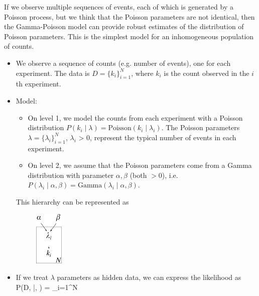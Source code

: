 If we observe multiple sequences of events, each of which is generated by a Poisson process, but we think that the Poisson parameters are not identical, then the Gamma-Poisson model can provide robust estimates of the distribution of Poisson parameters. This is the simplest model for an inhomogeneous population of counts.
\begin{itemize}
	\item We observe a sequence of counts (e.g. number of events), one for each experiment. The data is $D = \{k_i\}_{i=1}^N$, where $k_i$ is the count observed in the $i$th experiment.
	\item Model: 
	\begin{itemize}
		\item On level 1, we model the counts from each experiment with a Poisson distribution $P(k_i\;|\;\lambda) = \text{Poisson}(k_i\;|\;\lambda_i)$. The Poisson  parameters $\lambda = \{\lambda_i\}_{i=1}^N$, $\lambda_i$ > 0, represent the typical number of events in each experiment.
		\item On level 2, we assume that the Poisson parameters come from a Gamma distribution with parameter $\alpha, \beta$ (both $>0$), i.e.  $P(\lambda_i\;|\; \alpha, \beta) = \text{Gamma}(\lambda_i\;|\;\alpha, \beta)$.
	\end{itemize}
	This hierarchy can be represented as 
	\begin{figure}[h!]
		\centering
			\includegraphics[height=26mm]{./figs/04-GammaPoisson.pdf}
		\end{figure}
	\item If we treat $\lambda$ parameters as hidden data, we can express the likelihood as
	\be
		P(D, \lambda\;|\;\alpha, \beta) = \prod_{i=1}^N
	\ee


\end{itemize}
